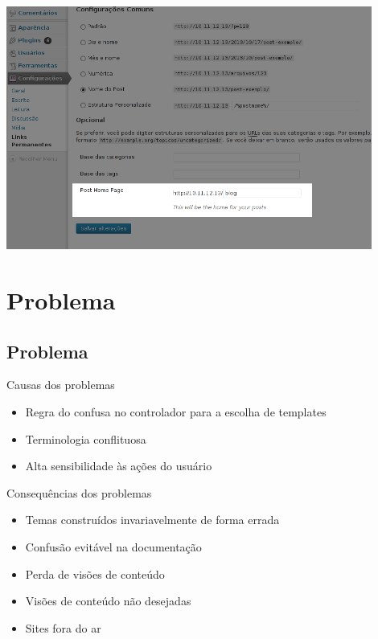 \documentclass[handout]{beamer}
\begin{document}
\begin{frame}
\begin{center}
  \includegraphics[width=0.9\textwidth]{./img/option-plugin-field.png}
\end{center}
\end{frame}

\section{Problema}
\subsection{Problema}

\begin{frame}{Causas dos problemas}
\begin{itemize}
  \pause \item Regra do confusa no controlador para a escolha de templates
  \pause \item Terminologia conflituosa
  \pause \item Alta sensibilidade às ações do usuário
\end{itemize}
\end{frame}

\begin{frame}{Consequências dos problemas}
\begin{itemize}
  \pause \item Temas construídos invariavelmente de forma errada
  \pause \item Confusão evitável na documentação
  \pause \item Perda de visões de conteúdo
  \pause \item Visões de conteúdo não desejadas
  \pause \item Sites fora do ar
\end{itemize}
\end{frame}
\end{document}

